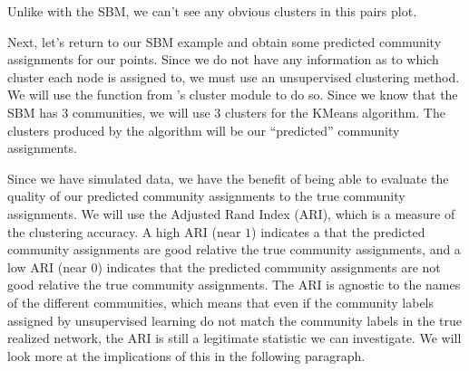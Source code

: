 \documentclass[letterpaper,10pt,english]{jupyterBook}
\begin{document}
\noindent{}

\sphinxAtStartPar
Unlike with the SBM, we can’t see any obvious clusters in this pairs plot.

\sphinxAtStartPar
Next, let’s return to our SBM example and obtain some predicted community assignments for our points. Since we do not have any information as to which cluster each node is assigned to, we must use an unsupervised clustering method. We will use the  function from ’s cluster module to do so. Since we know that the SBM has 3 communities, we will use 3 clusters for the KMeans algorithm. The clusters produced by the  algorithm will be our “predicted” community assignments.

\begin{sphinxVerbatim}[commandchars=\\\{\}]
   

    
\end{sphinxVerbatim}

\sphinxAtStartPar
Since we have simulated data, we have the benefit of being able to evaluate the quality of our predicted community assignments to the true community assignments. We will use the Adjusted Rand Index (ARI), which is a measure of the clustering accuracy. A high ARI (near \(1\)) indicates a that the predicted community assignments are good relative the true community assignments, and a low ARI (near \(0\)) indicates that the predicted community assignments are not good relative the true community assignments. The ARI is agnostic to the names of the different communities, which means that even if the community labels assigned by unsupervised learning do not match the community labels in the true realized network, the ARI is still a legitimate statistic we can investigate. We will look more at the implications of this in the following paragraph.

\begin{sphinxVerbatim}[commandchars=\\\{\}]
   

   
\end{sphinxVerbatim}
\end{document}
